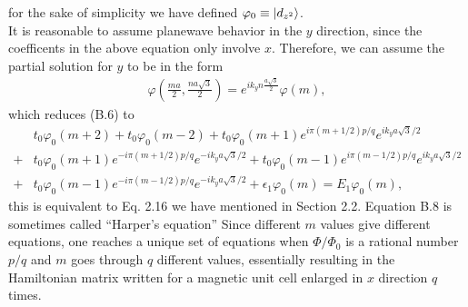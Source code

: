 \documentclass{report}
\newcommand{\f}[2]{\dfrac{#1}{#2}}
\begin{document}
for the sake of simplicity we have defined $\varphi_{0} \equiv \ket{d_{z^{2}}}$.\\
It is reasonable to assume planewave behavior in the $y$ direction, since the coefficents in the above equation only involve $x$. Therefore, we can assume the partial solution for $y$ to be in the form
\begin{gather}
	\varphi(\frac{ma}{2},\frac{na\sqrt{3}}{2}) = e^{i k_{y} n \frac{a\sqrt{3}}{2}} \varphi(m),
\end{gather}
which reduces (B.6) to
\begin{equation}
	\begin{aligned}
		  & t_{0} \varphi_{0}(m + 2) + t_{0} \varphi_{0}(m - 2) + t_{0} \varphi_{0}(m + 1) e^{i \pi (m + 1 /2) p/ q} e^{i k_{y} a\sqrt{3} / 2}                            \\
		+ & t_{0} \varphi_{0}(m + 1) e^{-i \pi (m + 1 /2) p/ q} e^{-i k_{y} a\sqrt{3} / 2} + t_{0} \varphi_{0}(m - 1) e^{i \pi (m - 1 /2) p/ q} e^{i k_{y} a\sqrt{3} / 2} \\
		+ & t_{0} \varphi_{0}(m - 1) e^{-i \pi (m - 1 /2) p/ q} e^{-i k_{y} a\sqrt{3} / 2} + \epsilon_{1} \varphi_{0}(m) = E_{1} \varphi_{0}(m),
	\end{aligned}
\end{equation}
this is equivalent to Eq. 2.16 we have mentioned in Section 2.2. Equation B.8 is sometimes called ``Harper's equation''\cite{harper1955general,PhysRevB.14.2239} Since different $m$ values give different equations, one reaches a unique set of equations when $\Phi / \Phi_{0}$ is a rational number $p / q$ and $m$ goes through $q$ different values, essentially resulting in the Hamiltonian matrix written for a magnetic unit cell enlarged in $x$ direction $q$ times.
\end{document}
